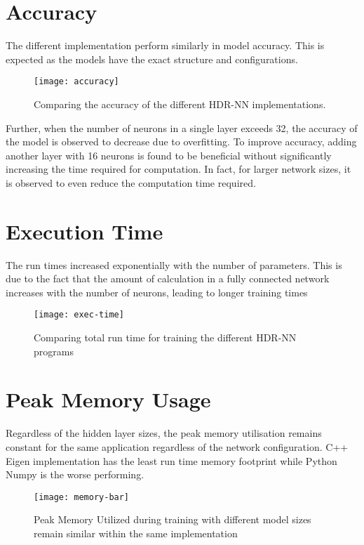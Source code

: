 


\section{Accuracy}
The different implementation perform similarly in model accuracy. This is expected as the models have the exact structure and configurations.  
\begin{figure}[ht]
	\centering
	\texttt{[image: accuracy]}
	\caption[HDR-NN Accuracy]{Comparing the accuracy of the different HDR-NN implementations.}
\end{figure}

Further, when the number of neurons in a single layer exceeds 32, the accuracy of the model is observed to decrease due to overfitting. To improve accuracy, adding another layer with 16 neurons is found to be beneficial without significantly increasing the time required for computation. In fact, for larger network sizes, it is observed to even reduce the computation time required.


\section{Execution Time}
The run times increased exponentially with the number of parameters. This is due to the fact that the amount of calculation in a fully connected network increases with the number of neurons, leading to longer training times

\begin{figure}[ht]
	\centering
	\texttt{[image: exec-time]}
	\caption[Execution Time vs Model Parameters]{Comparing total run time for training the different HDR-NN programs}
\end{figure}

\section{Peak Memory Usage}
Regardless of the hidden layer sizes, the peak memory utilisation remains constant for the same application regardless of the network configuration. C++ Eigen implementation has the least run time memory footprint while Python Numpy is the worse performing. 
\begin{figure}[ht]
	\centering
	\texttt{[image: memory-bar]}
	\caption[Peak Memory Utilisation]{Peak Memory Utilized during training with different model sizes remain similar within the same implementation}
\end{figure}


